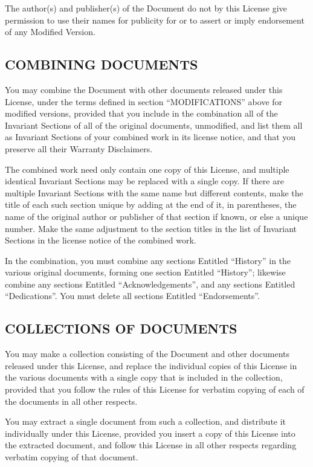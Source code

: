 \documentclass[a4paper,german,10pt,twoside]{book}
\begin{document}
{\begin{appendix}
{The author(s) and publisher(s) of the Document do not by this License give permission to use their
names for publicity for or to assert or imply endorsement of any Modified Version.


\subsection*{COMBINING DOCUMENTS}
\label{combining}

You may combine the Document with other documents released under this License, under the terms
defined in section ``MODIFICATIONS'' above for modified versions, provided that you include in the
combination all of the Invariant Sections of all of the original documents, unmodified, and list
them all as Invariant Sections of your combined work in its license notice, and that you preserve
all their Warranty Disclaimers.

The combined work need only contain one copy of this License, and multiple identical Invariant
Sections may be replaced with a single copy.  If there are multiple Invariant Sections with the
same name but different contents, make the title of each such section unique by adding at the end
of it, in parentheses, the name of the original author or publisher of that section if known, or
else a unique number. Make the same adjustment to the section titles in the list of Invariant
Sections in the license notice of the combined work.

In the combination, you must combine any sections Entitled ``History'' in the various original
documents, forming one section Entitled ``History''; likewise combine any sections Entitled
``Acknowledgements'', and any sections Entitled ``Dedications''.  You must delete all sections
Entitled ``Endorsements''.


\subsection*{COLLECTIONS OF DOCUMENTS}
\label{collections}

You may make a collection consisting of the Document and other documents released under this
License, and replace the individual copies of this License in the various documents with a single
copy that is included in the collection, provided that you follow the rules of this License for
verbatim copying of each of the documents in all other respects.

You may extract a single document from such a collection, and distribute it individually under this
License, provided you insert a copy of this License into the extracted document, and follow this
License in all other respects regarding verbatim copying of that document.


}
\end{appendix}}
\end{document}
